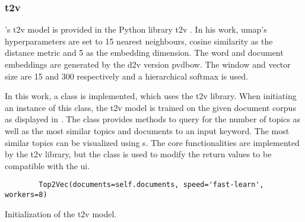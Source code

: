 \subsubsection*{\ac{t2v}}\label{subsubsec:impl-top2vec}

\citeauthor{Top2Vec2020}'s \ac{t2v} model is provided in the Python library \ac{t2v} \cite{Top2Vec2020}.
In his work, \ac{umap}'s hyperparameters are set to 15 nearest neighbours, 
cosine similarity as the distance metric and 5 as the embedding dimension.
The word and document embeddings are generated by the \ac{d2v} version \ac{pvdbow}.
The window and vector size are 15 and 300 respectively and a hierarchical softmax is used.

In this work, a class is implemented, which uses the \ac{t2v} library.
When initiating an instance of this class, the \ac{t2v} model is trained on the given document corpus as displayed in .
The class provides methods to query for the number of topics as well as the 
most similar topics and documents to an input keyword.
The most similar topics can be visualized using \wordcloud{}s.
The core functionalities are implemented by the \ac{t2v} library, 
but the class is used to modify the return values to be compatible with the \ac{ui}.

\begin{listing}[htp]
    \begin{verbatim}
        Top2Vec(documents=self.documents, speed='fast-learn', workers=8)
    \end{verbatim}
    \caption[Initialization of the \ac{t2v} model]
    {Initialization of the \ac{t2v} model.
    }
    \label{lst:init-top2vec}
\end{listing}